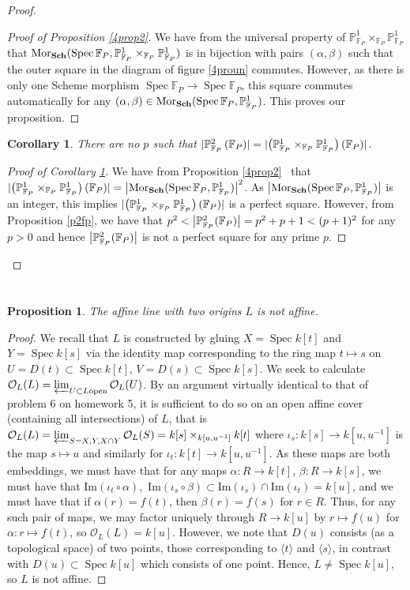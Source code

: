 \documentclass[english,letter,doublesided]{article}
\DeclareMathOperator{\spec}{Spec}
\newcommand{\mor}{\mathrm{Mor}}
\DeclarePairedDelimiter\abs{\lvert}{\rvert}%
\newcommand{\OO}{\mathcal{O}}
\newcommand{\FF}{\mathbb{F}}
\newcommand{\PP}{\mathbb{P}}
\newenvironment{subproof}[1][\proofname]{%
	\renewcommand{\qedsymbol}{$\blacksquare$}%
	\begin{proof}[#1]%
	}{%
	\end{proof}%
}
\newcommand{\prob}[1]{\setcounter{section}{#1-1}\section{}}
\newtheorem{cor}[thm]{Corollary}
\newtheorem*{prop*}{Proposition}
\theoremstyle{remark}
\theoremstyle{definition}
\newcommand{\im}{\mathrm{Im}}
\newcommand{\cat}[1]{{\mathrm{\bf{#1}}}}
\newcommand{\clim}{\varprojlim}
\newcommand{\Fp}{{\FF_P}}
\begin{document}
\begin{proof}
\begin{subproof}[Proof of Proposition \ref{4prop2}]
We have from the universal property of $\PP^1_\Fp\times_\Fp\PP^1_\Fp$ that $\mor_{\cat{Sch}}(\spec \Fp,\PP^1_\Fp\times_\Fp\PP^1_\Fp)$ is in bijection with pairs $(\alpha,\beta)$ such that the outer square in the diagram of figure \ref{4proun} commutes. However, as there is only one Scheme morphism $\spec \Fp\to \spec \Fp$, this square commutes automatically for any $(\alpha,\beta)\in \mor_{\cat{Sch}}(\spec\Fp,\PP^1_\Fp)$. This proves our proposition.
\end{subproof}
\begin{cor}\label{4nop}
	There are no $p$ such that  $\abs{\PP_{\Fp}^2\left(\Fp\right)}=\abs{\left(\PP^1_\Fp\times_\Fp\PP^1_\Fp\right)(\Fp)}$.
\end{cor}
\begin{subproof}[Proof of Corollary \ref{4nop}]
	We have from Proposition \ref{4prop2}~ that $\abs{\left(\PP^1_\Fp\times_\Fp\PP^1_\Fp\right)(\Fp)}=\abs*{\mor_{\cat{Sch}}(\spec\Fp,\PP^1_\Fp)}^2$. As $\abs*{\mor_{\cat{Sch}}(\spec\Fp,\PP^1_\Fp)}$ is an integer, this implies $\abs{\left(\PP^1_\Fp\times_\Fp\PP^1_\Fp\right)(\Fp)}$ is a perfect square. However, from Proposition \ref{p2fp}, we have that $p^2<\abs*{\PP^2_\Fp(\Fp)}=p^2+p+1<(p+1)^2$ for any $p>0$ and hence $\abs*{\PP^2_\Fp(\Fp)}$ is not a perfect square for any prime $p$.
\end{subproof}
\end{proof}
%
%
%
\prob{5} 
\begin{prop*}
	The affine line with two origins $L$ is not affine.
\end{prop*}
\begin{proof}
	We recall that $L$ is constructed by gluing $X=\spec k[t]$ and $Y=\spec k[s]$ via the identity map corresponding to the ring map $t\mapsto s$ on $U=D(t)\subset \spec k[t]$, $V= D(s)\subset \spec k[s]$. We seek to calculate $\OO_{L}(L)=\clim_{U\subset L \text{open}}\OO_L(U)$. By an argument virtually identical to that of problem 6 on homework 5, it is sufficient to do so on an open affine cover (containing all intersections) of $L$, that is $\OO_L(L)=\clim_{S=X,Y,X\cap Y}\OO_L(S)=k[s]\times_{k[u,u^{-1}]} k[t]$ where $\iota_s:k[s]\to k[u,u^{-1}]$ is the map $s\mapsto u$ and similarly for $\iota_t:k[t]\to k[u,u^{-1}]$. As these maps are both embeddings, we must have that for any maps $\alpha:R\to k[t]$, $\beta:R\to k[s]$, we must have that $\im(\iota_t\circ \alpha),$ $\im (\iota_s\circ \beta)\subset \im (\iota_s)\cap \im (\iota_t)=k[u]$, and we must have that if $\alpha(r)=f(t)$, then $\beta(r)=f(s)$ for $r\in R$. Thus, for any such pair of maps, we may factor uniquely through $R\to k[u]$ by $r\mapsto f(u)$ for $\alpha:r\mapsto f(t)$, so $\OO_L(L)=k[u]$. However, we note that $D(u)$ consists (as a topological space) of two points, those corresponding to $\langle t \rangle $ and $\langle s \rangle$, in contrast with $D(u)\subset \spec k[u]$ which consists of one point. Hence, $L\neq \spec k[u]$, so $L$ is not affine.
\end{proof}
\end{document}
